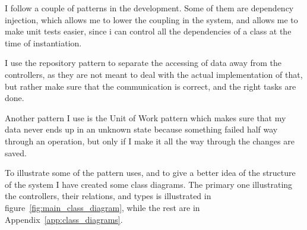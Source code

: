 I follow a couple of patterns in the development. Some of them are dependency
injection, which allows me to lower the coupling in the system, and allows me
to make unit tests easier, since i can control all the dependencies of a class
at the time of instantiation.

I use the repository pattern to separate the accessing of data away from the
controllers, as they are not meant to deal with the actual implementation of
that, but rather make sure that the communication is correct, and the right
tasks are done.

Another pattern I use is the Unit of Work pattern which makes sure that my data
never ends up in an unknown state because something failed half way through an
operation, but only if I make it all the way through the changes are saved.

To illustrate some of the pattern uses, and to give a better idea of the
structure of the system I have created some class diagrams. The primary one
illustrating the controllers, their relations, and types is illustrated
in figure~\ref{fig:main_class_diagram}, while the rest are in
Appendix~\ref{app:class_diagrams}.